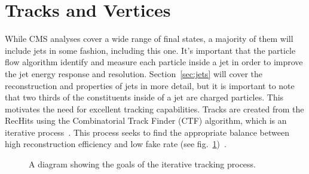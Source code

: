 \section{Tracks and Vertices}
\label{sec:tracks_and_vertices}

While CMS analyses cover a wide range of final states, a majority of them will include jets in some fashion, including this one.
It's important that the particle flow algorithm identify and measure each particle inside a jet in order to improve the jet energy response and resolution.
Section~\ref{sec:jets} will cover the reconstruction and properties of jets in more detail, but it is important to note that two thirds of the constituents inside of a jet are charged particles.
This motivates the need for excellent tracking capabilities.
Tracks are created from the RecHits using the Combinatorial Track Finder (CTF) algorithm, which is an iterative process~\cite{TRK-11-001}.
This process seeks to find the appropriate balance between high reconstruction efficiency and low fake rate (see fig.~\ref{fig:efficiency_vs_fake_rate})~\cite{CMS-PAS-PFT-09-001}.

\begin{figure}[!hbt]
    \centering
    \caption{A diagram showing the goals of the iterative tracking process.}
    \label{fig:efficiency_vs_fake_rate}
\end{figure}

